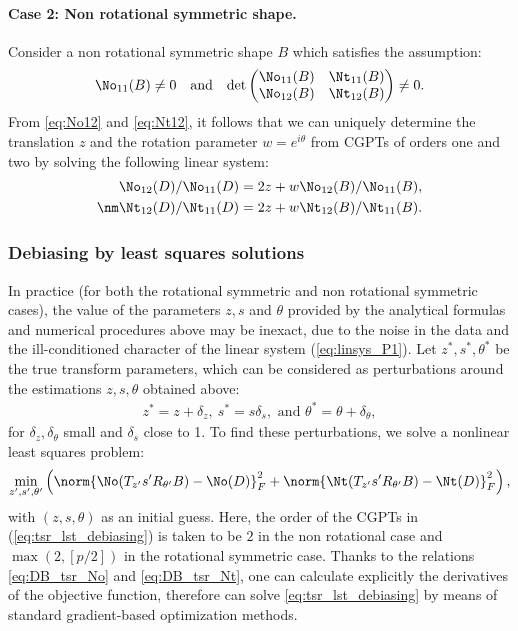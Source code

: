 \paragraph{Case 2: Non rotational symmetric shape.}
Consider a non rotational symmetric shape $B$ which satisfies the
assumption:
\begin{align}
  \label{eq:cond_P1}
 \No_{11}(B) \neq 0 \quad \mbox{and} \quad  \mbox{det}
  \begin{pmatrix}
    \No_{11}(B) & \Nt_{11}(B) \\
    \No_{12}(B) & \Nt_{12}(B)
  \end{pmatrix} \neq 0.
\end{align}
From \eqref{eq:No12} and \eqref{eq:Nt12}, it follows that we can
uniquely determine the translation $z$ and the rotation parameter
$w= e^{i\theta}$ from CGPTs of orders one and two by solving the
following linear system:
\begin{align}
  \label{eq:linsys_P1}
  \No_{12}(D)/\No_{11}(D) &= 2z + w \No_{12}(B)/\No_{11}(B), \notag \\
  \nm
  \Nt_{12}(D)/\Nt_{11}(D) &= 2z + w \Nt_{12}(B)/\Nt_{11}(B).
\end{align}


\subsubsection{Debiasing by least squares solutions} \label{secdeb} In practice (for both the rotational symmetric and non rotational
symmetric cases), the value of the parameters $z, s$ and $\theta$
provided by the analytical formulas and numerical procedures above
may be inexact, due to the noise in the data and the
ill-conditioned character of the linear system
(\ref{eq:linsys_P1}). Let $z^*, s^*, \theta^*$ be the true
transform parameters, which can be considered as  perturbations
around the estimations $z, s, \theta$ obtained above:
\begin{align}
  z^*=z+\delta_z, \ s^*=s \delta_s, \mbox{ and } \theta^*=\theta+\delta_\theta , \label{eq:parameters_pertub}
\end{align}
for $\delta_z, \delta_\theta$ small and $\delta_s$ close to 1. To
find these perturbations, we solve a nonlinear least squares
problem:
\begin{align}
  \min_{z',s',\theta'}
  \left(\norm{\No(T_{z'}s'R_{\theta'} B) -
      \No(D)}_F^2 +
    \norm{\Nt(T_{z'}s'R_{\theta'} B) - \Nt(
      D)}_F^2\right) , \label{eq:tsr_lst_debiasing}
\end{align}
with $(z,s,\theta)$ as an initial guess. Here, the order of the
CGPTs in (\ref{eq:tsr_lst_debiasing}) is taken to be $2$ in the
non rotational case and $\max(2, [p/2])$ in the rotational
symmetric case. Thanks to the relations \eqref{eq:DB_tsr_No} and
\eqref{eq:DB_tsr_Nt}, one can calculate explicitly the derivatives
of the objective function, therefore can solve
\eqref{eq:tsr_lst_debiasing} by means of standard gradient-based
optimization methods.

